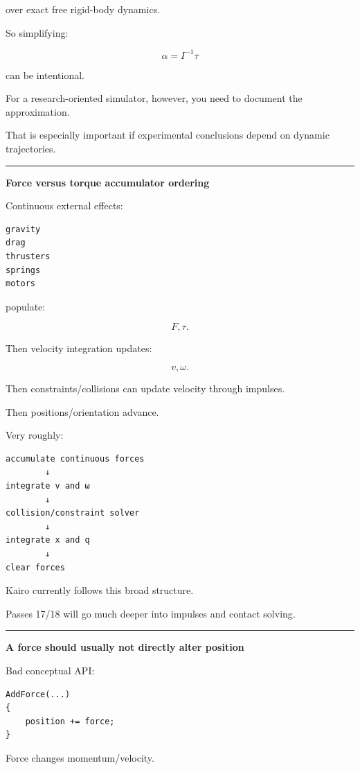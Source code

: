 over exact free rigid-body dynamics.

So simplifying:

\[
\alpha=I^{-1}\tau
\]

can be intentional.

For a research-oriented simulator, however, you need to document the approximation.

That is especially important if experimental conclusions depend on dynamic trajectories.

\begin{center}\rule{0.5\linewidth}{0.5pt}\end{center}

\textbf{Force versus torque accumulator ordering}

Continuous external effects:

\begin{verbatim}
gravity
drag
thrusters
springs
motors
\end{verbatim}

populate:

\[
F,\tau.
\]

Then velocity integration updates:

\[
v,\omega.
\]

Then constraints/collisions can update velocity through impulses.

Then positions/orientation advance.

Very roughly:

\begin{verbatim}
accumulate continuous forces
        ↓
integrate v and ω
        ↓
collision/constraint solver
        ↓
integrate x and q
        ↓
clear forces
\end{verbatim}

Kairo currently follows this broad structure.

Passes 17/18 will go much deeper into impulses and contact solving.

\begin{center}\rule{0.5\linewidth}{0.5pt}\end{center}

\textbf{A force should usually not directly alter position}

Bad conceptual API:

\begin{verbatim}
AddForce(...)
{
    position += force;
}
\end{verbatim}

Force changes momentum/velocity.

